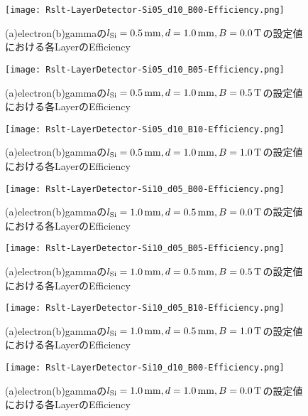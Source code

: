 \documentclass[a4paper,10pt]{jreport}
\begin{document}
\begin{figure}[H]
	\center
	\texttt{[image: Rslt-LayerDetector-Si05\_d10\_B00-Efficiency.png]}
	\caption{(a)electron(b)gammaの$l_{\rm{Si}}=\SI{0.5}{mm}, d=\SI{1.0}{mm}, B=\SI{0.0}{T}$の設定値における各LayerのEfficiency}
	\label{Rslt-LayerDetector-Si05_d10_B00-Efficiency}
\end{figure}

\begin{figure}[H]
	\center
	\texttt{[image: Rslt-LayerDetector-Si05\_d10\_B05-Efficiency.png]}
	\caption{(a)electron(b)gammaの$l_{\rm{Si}}=\SI{0.5}{mm}, d=\SI{1.0}{mm}, B=\SI{0.5}{T}$の設定値における各LayerのEfficiency}
	\label{Rslt-LayerDetector-Si05_d10_B05-Efficiency}
\end{figure}

\begin{figure}[H]
	\center
	\texttt{[image: Rslt-LayerDetector-Si05\_d10\_B10-Efficiency.png]}
	\caption{(a)electron(b)gammaの$l_{\rm{Si}}=\SI{0.5}{mm}, d=\SI{1.0}{mm}, B=\SI{1.0}{T}$の設定値における各LayerのEfficiency}
	\label{Rslt-LayerDetector-Si05_d10_B10-Efficiency}
\end{figure}

\begin{figure}[H]
	\center
	\texttt{[image: Rslt-LayerDetector-Si10\_d05\_B00-Efficiency.png]}
	\caption{(a)electron(b)gammaの$l_{\rm{Si}}=\SI{1.0}{mm}, d=\SI{0.5}{mm}, B=\SI{0.0}{T}$の設定値における各LayerのEfficiency}
	\label{Rslt-LayerDetector-Si10_d05_B00-Efficiency}
\end{figure}

\begin{figure}[H]
	\center
	\texttt{[image: Rslt-LayerDetector-Si10\_d05\_B05-Efficiency.png]}
	\caption{(a)electron(b)gammaの$l_{\rm{Si}}=\SI{1.0}{mm}, d=\SI{0.5}{mm}, B=\SI{0.5}{T}$の設定値における各LayerのEfficiency}
	\label{Rslt-LayerDetector-Si10_d05_B05-Efficiency}
\end{figure}

\begin{figure}[H]
	\center
	\texttt{[image: Rslt-LayerDetector-Si10\_d05\_B10-Efficiency.png]}
	\caption{(a)electron(b)gammaの$l_{\rm{Si}}=\SI{1.0}{mm}, d=\SI{0.5}{mm}, B=\SI{1.0}{T}$の設定値における各LayerのEfficiency}
	\label{Rslt-LayerDetector-Si10_d05_B10-Efficiency}
\end{figure}

\begin{figure}[H]
	\center
	\texttt{[image: Rslt-LayerDetector-Si10\_d10\_B00-Efficiency.png]}
	\caption{(a)electron(b)gammaの$l_{\rm{Si}}=\SI{1.0}{mm}, d=\SI{1.0}{mm}, B=\SI{0.0}{T}$の設定値における各LayerのEfficiency}
	\label{Rslt-LayerDetector-Si10_d10_B00-Efficiency}
\end{figure}
\end{document}
